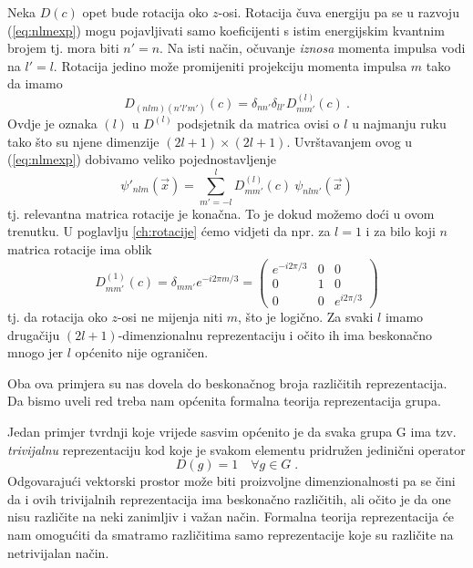 \begin{primjer}
Neka $D(c)$ opet bude rotacija oko $z$-osi.
Rotacija čuva energiju pa se u razvoju (\ref{eq:nlmexp}) mogu pojavljivati 
samo koeficijenti s istim energijskim kvantnim brojem tj. mora biti $n'=n$. 
Na isti način, očuvanje \emph{iznosa} momenta impulsa vodi na $l'=l$. Rotacija
jedino može promijeniti projekciju momenta impulsa $m$ tako da imamo
\begin{displaymath}
D_{(nlm)(n'l'm')}(c)=\delta_{nn'}\delta_{ll'}D^{(l)}_{mm'}(c) \:.
\end{displaymath}
Ovdje je oznaka $(l)$ u $D^{(l)}$ podsjetnik da matrica ovisi o $l$ u najmanju
ruku tako što su njene dimenzije $(2l+1)\times (2l+1)$. Uvrštavanjem ovog u
(\ref{eq:nlmexp}) dobivamo veliko pojednostavljenje
\begin{displaymath}
\psi'_{nlm}(\vec{x})=  \sum_{m'=-l}^{l} D^{(l)}_{mm'}(c) \: \psi_{nlm'}(\vec{x})
\end{displaymath}
tj. relevantna matrica rotacije je konačna.
To je dokud možemo doći u ovom trenutku. U poglavlju \ref{ch:rotacije} ćemo
vidjeti da npr. za $l=1$ i za bilo koji $n$ matrica rotacije ima oblik
\begin{equation*}
D^{(1)}_{mm'}(c)=\delta_{mm'}e^{ -i 2\pi m/3} =
\begin{pmatrix}
e^{-i2\pi/3} & 0 & 0 \\
0 &  1 & 0 \\
0 & 0 & e^{i 2\pi/3}
\end{pmatrix}
\end{equation*}
tj. da rotacija oko $z$-osi ne mijenja niti $m$, što je logično.
Za svaki $l$ imamo drugačiju $(2l+1)$-dimenzionalnu reprezentaciju i
očito ih ima beskonačno mnogo jer $l$ općenito nije ograničen.
\end{primjer}

Oba ova primjera su nas dovela do beskonačnog broja različitih
reprezentacija.
Da bismo uveli red treba nam općenita formalna teorija reprezentacija grupa.


Jedan primjer tvrdnji koje vrijede sasvim općenito je
da svaka grupa G ima tzv. \emph{trivijalnu} reprezentaciju
kod koje je svakom elementu pridružen jedinični operator
\begin{displaymath}
             D(g)=1 \quad \forall g \in G  \;.
\end{displaymath}
Odgovarajući vektorski prostor može biti proizvoljne
dimenzionalnosti pa se čini da i ovih trivijalnih reprezentacija 
ima beskonačno različitih, ali očito je da one nisu različite
na neki zanimljiv i važan način. Formalna teorija reprezentacija
će nam omogućiti da smatramo različitima samo reprezentacije koje
su različite na netrivijalan način.

